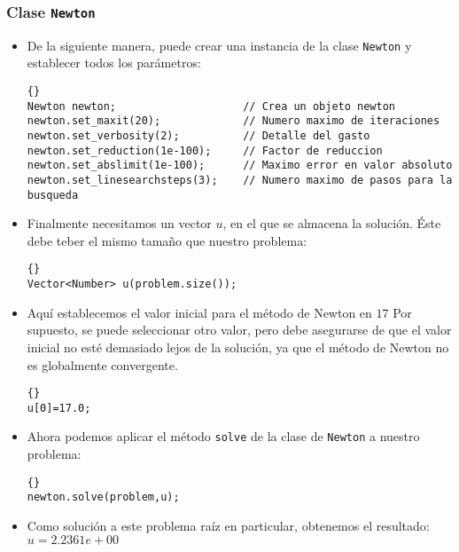 \subsubsection{Clase \lstinline{Newton}}
\begin{itemize}
\item De la siguiente manera, puede crear una instancia de la clase \lstinline{Newton} y establecer todos los parámetros:

    {\footnotesize{\begin{lstlisting}{}
Newton newton;                    // Crea un objeto newton
newton.set_maxit(20);             // Numero maximo de iteraciones 
newton.set_verbosity(2);          // Detalle del gasto
newton.set_reduction(1e-100);     // Factor de reduccion
newton.set_abslimit(1e-100);      // Maximo error en valor absoluto
newton.set_linesearchsteps(3);    // Numero maximo de pasos para la busqueda
\end{lstlisting}}}

\item Finalmente necesitamos un vector $u$, en el que se almacena la solución. 
Éste debe teber el mismo tamaño que nuestro problema:

  {\footnotesize{\begin{lstlisting}{}
Vector<Number> u(problem.size());
\end{lstlisting}}}

\item Aquí establecemos el valor inicial para el método de Newton en $17$ Por supuesto, se puede seleccionar otro valor, pero debe asegurarse de que el valor inicial no esté demasiado lejos de la solución, ya que el método de Newton no es globalmente convergente.
  {\footnotesize{\begin{lstlisting}{}
u[0]=17.0;
\end{lstlisting}}}

\item Ahora podemos aplicar el método \lstinline{solve} de la clase de \lstinline{Newton} a nuestro problema:

  {\footnotesize{\begin{lstlisting}{}
newton.solve(problem,u);
\end{lstlisting}}}

\item Como solución a este problema raíz en particular, obtenemos el resultado:\\
  $u= 2.2361e+00$
\end{itemize}

